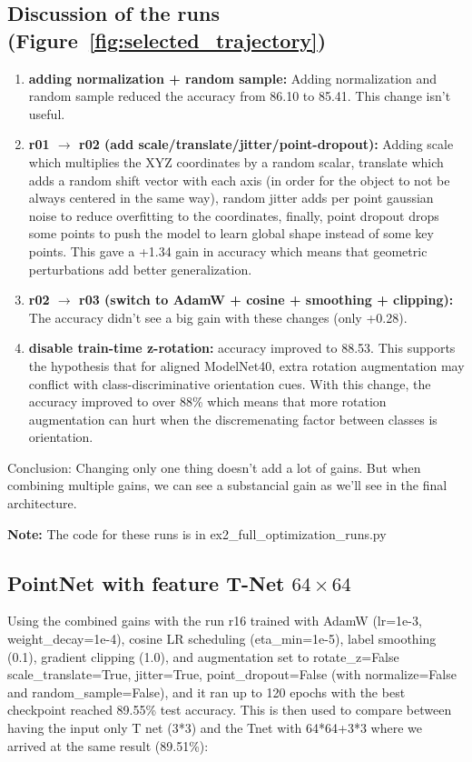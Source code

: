 \documentclass[11pt,a4paper]{article}
\begin{document}
\subsection{Discussion of the runs (Figure~\ref{fig:selected_trajectory})}

\begin{enumerate}[leftmargin=*]
  \item \textbf{adding normalization + random sample:} Adding normalization and random sample reduced the accuracy from 86.10 to 85.41. This change isn't useful.
  \item \textbf{r01 $\rightarrow$ r02 (add scale/translate/jitter/point-dropout):} Adding scale which multiplies the XYZ coordinates by a random scalar, translate which adds a random shift vector with each axis (in order for the object to not be always centered in the same way), random jitter adds per point gaussian noise to reduce overfitting to the coordinates, finally, point dropout drops some points to push the model to learn global shape instead of some key points. This gave a +1.34 gain in accuracy which means that geometric perturbations add better generalization.
  \item \textbf{r02 $\rightarrow$ r03 (switch to AdamW + cosine + smoothing + clipping):} The accuracy didn't see a big gain with these changes (only +0.28).
  \item \textbf{disable train-time z-rotation:} accuracy improved to 88.53. This supports the hypothesis that for aligned ModelNet40, extra rotation augmentation may conflict with class-discriminative orientation cues.
  With this change, the accuracy improved to over 88\% which means that more rotation augmentation can hurt when the discremenating factor between classes is orientation.


\end{enumerate}

Conclusion: Changing only one thing doesn't add a lot of gains. But when combining multiple gains, we can see a substancial gain as we'll see in the final architecture.

\textbf{Note: } The code for these runs is in ex2\_full\_optimization\_runs.py 

\subsection{PointNet with feature T-Net $64\times64$}
Using the combined gains with the run r16 trained with AdamW (lr=1e-3, weight\_decay=1e-4), cosine LR scheduling (eta\_min=1e-5), label smoothing (0.1), gradient clipping (1.0), and augmentation set to rotate\_z=False scale\_translate=True, jitter=True, point\_dropout=False (with normalize=False and random\_sample=False), and it ran up to 120 epochs with the best checkpoint reached 89.55\% test accuracy. This is then used to compare between having the input only T net (3*3) and the Tnet with 64*64+3*3 where we arrived at the same result (89.51\%): 
\end{document}
